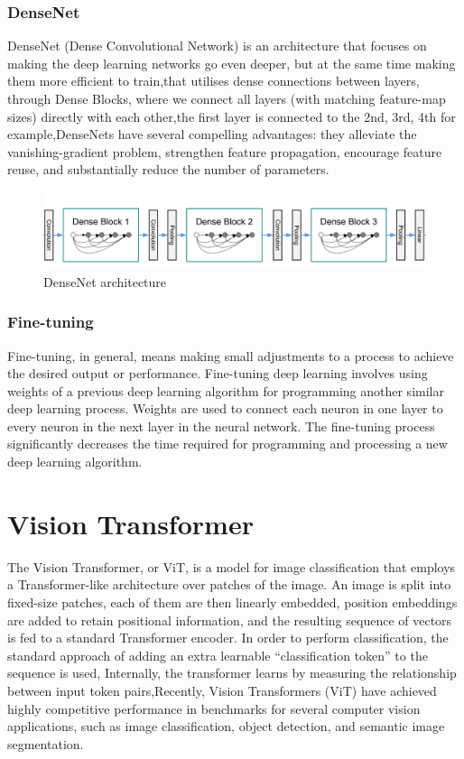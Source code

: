 \subsubsection{DenseNet}
DenseNet (Dense Convolutional Network) is an architecture that focuses on making the deep learning networks go even deeper, but at the same time making them more efficient to train,that utilises dense connections between layers, through Dense Blocks, where we connect all layers (with matching feature-map sizes) directly with each other,the first layer is connected to the 2nd, 3rd, 4th for example,DenseNets have several compelling advantages: they alleviate the vanishing-gradient problem, strengthen feature propagation, encourage feature reuse, and substantially reduce the number of parameters.\cite{art47}

\begin{figure}[!h]
    \centering
    \includegraphics[width=1\textwidth]{chapters/chapter02/fig02/densnet.png}
    \caption{ DenseNet architecture}
    \label{fig:my_label}
\end{figure}
 
 
  

\subsubsection{Fine-tuning}
Fine-tuning, in general, means making small adjustments to a process to achieve the desired output or performance. Fine-tuning deep learning involves using weights of a previous deep learning algorithm for programming another similar deep learning process. Weights are used to connect each neuron in one layer to every neuron in the next layer in the neural network. The fine-tuning process significantly decreases the time required for programming and processing a new deep learning algorithm.

\newpage

\section{Vision Transformer}
The Vision Transformer, or ViT, is a model for image classification that employs a Transformer-like architecture over patches of the image. An image is split into fixed-size patches, each of them are then linearly embedded, position embeddings are added to retain positional information, and the resulting sequence of vectors is fed to a standard Transformer encoder. In order to perform classification, the standard approach of adding an extra learnable “classification token” to the sequence is used, Internally, the transformer learns by measuring the relationship between input token pairs,Recently, Vision Transformers (ViT) have achieved highly competitive performance in benchmarks for several computer vision applications, such as image classification, object detection, and semantic image segmentation.\cite{art46} \\

